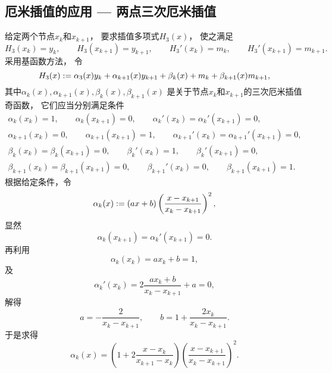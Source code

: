 \subsection{厄米插值的应用 --- 两点三次厄米插值}
给定两个节点\(x_k\)和\(x_{k+1}\)，
要求插值多项式\(H_3(x)\)，
使之满足\begin{equation*}
	H_3(x_k) = y_k,
	\qquad
	H_3(x_{k+1}) = y_{k+1},
	\qquad
	H_3'(x_k) = m_k,
	\qquad
	H_3'(x_{k+1}) = m_{k+1}.
\end{equation*}
采用基函数方法，
令\begin{equation*}
	H_3(x)
	:=
	\alpha_3(x) y_k
	+ \alpha_{k+1}(x) y_{k+1}
	+ \beta_k(x) + m_k
	+ \beta_{k+1}(x) m_{k+1},
\end{equation*}
其中\(\alpha_k(x),\alpha_{k+1}(x),\beta_k(x),\beta_{k+1}(x)\)
是关于节点\(x_k\)和\(x_{k+1}\)的三次厄米插值奇函数，
它们应当分别满足条件\begin{gather*}
	\alpha_k(x_k) = 1,
	\qquad
	\alpha_k(x_{k+1}) = 0,
	\qquad
	\alpha_k'(x_k)
	= \alpha_k'(x_{k+1})
	= 0, \\
	\alpha_{k+1}(x_k) = 0,
	\qquad
	\alpha_{k+1}(x_{k+1}) = 1,
	\qquad
	\alpha_{k+1}'(x_k)
	= \alpha_{k+1}'(x_{k+1})
	= 0, \\
	\beta_k(x_k)
	= \beta_k(x_{k+1})
	= 0,
	\qquad
	\beta_k'(x_k) = 1,
	\qquad
	\beta_k'(x_{k+1}) = 0, \\
	\beta_{k+1}(x_k)
	= \beta_{k+1}(x_{k+1})
	= 0,
	\qquad
	\beta_{k+1}'(x_k) = 0,
	\qquad
	\beta_{k+1}(x_{k+1}) = 1.
\end{gather*}
根据给定条件，令\begin{equation*}
	\alpha_k(x)
	:=
	(a x + b)
	\left( \frac{x - x_{k+1}}{x_k - x_{k+1}} \right)^2,
\end{equation*}
显然\begin{equation*}
	\alpha_k(x_{k+1})
	= \alpha_k'(x_{k+1})
	= 0.
\end{equation*}
再利用\begin{equation*}
	\alpha_k(x_k)
	= a x_k + b
	= 1,
\end{equation*}
及\begin{equation*}
	\alpha_k'(x_k)
	= 2 \frac{a x_k + b}{x_k - x_{k+1}} + a
	= 0,
\end{equation*}
解得\begin{equation*}
	a = - \frac{2}{x_k - x_{k+1}},
	\qquad
	b = 1 + \frac{2 x_k}{x_k - x_{k+1}}.
\end{equation*}
于是求得\begin{equation*}
	\alpha_k(x)
	= \left( 1 + 2 \frac{x - x_k}{x_{k+1} - x_k} \right)
	\left( \frac{x - x_{k+1}}{x_k - x_{k+1}} \right)^2.
\end{equation*}
